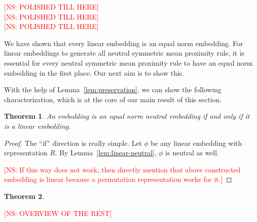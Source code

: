 \documentclass[10pt,letterpaper]{article}
\newtheorem{theorem}{Theorem}
\newcommand{\kibitz}[2]{\ifnum\Comments=1\textcolor{#1}{#2}\fi}
\newcommand{\cns}[1]{\kibitz{red} {[NS: #1]}}
\begin{document}
\cns{POLISHED TILL HERE}\\
\cns{POLISHED TILL HERE}\\
\cns{POLISHED TILL HERE}


We have shown that every linear embedding is an equal norm embedding. For linear embeddings to generate all neutral symmetric mean proximity rule, it is essential for every neutral symmetric mean proximity rule to have an equal norm embedding in the first place. Our next aim is to show this. 



With the help of Lemma~\ref{lem:preservation}, we can show the following characterization, which is at the core of our main result of this section.
\begin{theorem}
An embedding is an equal norm neutral embedding if and only if it is a linear embedding.
\label{thm:neutral-linear}
\end{theorem}
\begin{proof}
The ``if'' direction is really simple. Let $\phi$ be any linear embedding with representation $R$. By Lemma~\ref{lem:linear-neutral}, $\phi$ is neutral as well. 


\cns{If this way does not work, then directly mention that above constructed embedding is linear because a permutation representation works for it.}

\end{proof}

\begin{theorem}
\end{theorem}

\cns{OVERVIEW OF THE REST}
\end{document}
